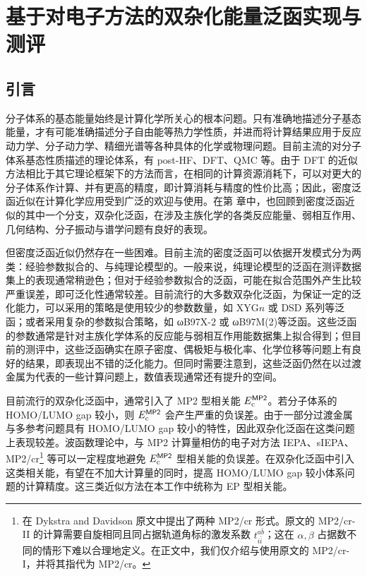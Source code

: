 
\chapter{基于对电子方法的双杂化能量泛函实现与测评}
\label{sec.2.title}

\section{引言}

分子体系的基态能量始终是计算化学所关心的根本问题。只有准确地描述分子基态能量，才有可能准确描述分子自由能等热力学性质，并进而将计算结果应用于反应动力学、分子动力学、精细光谱等各种具体的化学或物理问题。目前主流的对分子体系基态性质描述的理论体系，有 post-HF、DFT、QMC 等。由于 DFT 的近似方法相比于其它理论框架下的方法而言，在相同的计算资源消耗下，可以对更大的分子体系作计算、并有更高的精度，即计算消耗与精度的性价比高；因此，密度泛函近似在计算化学应用受到广泛的欢迎与使用。在第  章中，也回顾到密度泛函近似的其中一个分支，双杂化泛函，在涉及主族化学的各类反应能量、弱相互作用、几何结构、分子振动与谱学问题有良好的表现。

但密度泛函近似仍然存在一些困难。目前主流的密度泛函可以依据开发模式分为两类：经验参数拟合的、与纯理论模型的。一般来说，纯理论模型的泛函在测评数据集上的表现通常稍逊色\cite{Goerigk-Grimme.PCCP.2017}；但对于经验参数拟合的泛函，可能在拟合范围外产生比较严重误差，即可泛化性通常较差\cite{Medvedev-Lyssenko.S.2017}。目前流行的大多数双杂化泛函，为保证一定的泛化能力，可以采用的策略是使用较少的参数数量，如 XYG$n$\cite{Zhang-Xu.JPCL.2021} 或 DSD 系列\cite{Kozuch-Martin.JCC.2013}等泛函；或者采用复杂的参数拟合策略，如 ωB97X-2\cite{Chai-Head-Gordon.JCP.2009} 或 ωB97M(2)\cite{Mardirossian-Head-Gordon.JCP.2018}等泛函。这些泛函的参数通常是针对主族化学体系的反应能与弱相互作用能数据集上拟合得到；但目前的测评中，这些泛函确实在原子密度\cite{Su-Xu.PNAS.2018}、偶极矩与极化率\cite{Hait-Head-Gordon.JCTC.2018, Hait-Head-Gordon.PCCP.2018}、化学位移\cite{Stoychev-Neese.JCTC.2018}等问题上有良好的结果，即表现出不错的泛化能力。但同时需要注意到，这些泛函仍然在以过渡金属为代表的一些计算问题上，数值表现通常还有提升的空间。

目前流行的双杂化泛函中，通常引入了 MP2 型相关能 $E_\mathrm{c}^{\textsf{MP2}}$。若分子体系的 HOMO/LUMO gap 较小，则 $E_\mathrm{c}^{\textsf{MP2}}$ 会产生严重的负误差。由于一部分过渡金属与多参考问题具有 HOMO/LUMO gap 较小的特性，因此双杂化泛函在这类问题上表现较差。波函数理论中，与 MP2 计算量相仿的电子对方法 IEPA\cite{Sinanoǧlu-Sinanoǧlu.ACP.1964, Nesbet-Nesbet.ACP.1965}、sIEPA\cite{Zhang-Scheffler.PRL.2016}、MP2/cr\cite{Dykstra-Davidson.IJQC.2000}\footnote{在 Dykstra and Davidson 原文\cite{Dykstra-Davidson.IJQC.2000}中提出了两种 MP2/cr 形式。原文的 MP2/cr-II 的计算需要自旋相同且同占据轨道角标的激发系数 $t_{i \bar i}^{a \bar b}$；这在 $\alpha, \beta$ 占据数不同的情形下难以合理地定义。在正文中，我们仅介绍与使用原文的 MP2/cr-I，并将其指代为 MP2/cr。} 等可以一定程度地避免 $E_\mathrm{c}^{\textsf{MP2}}$ 型相关能的负误差。在双杂化泛函中引入这类相关能，有望在不加大计算量的同时，提高 HOMO/LUMO gap 较小体系问题的计算精度。这三类近似方法在本工作中统称为 EP 型相关能。

